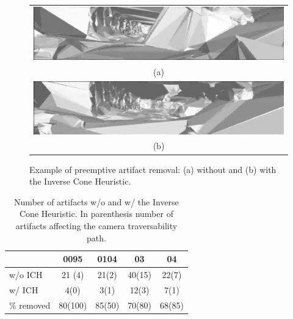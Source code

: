 \begin{figure}
\centering
\begin{tabular}{c}
\includegraphics[width=0.92\columnwidth]{./img//inverseConeWithout}\\
(a)\\
\includegraphics[width=0.92\columnwidth]{./img//inverseConeWith}\\
(b) 
\end{tabular}
\caption{Example of preemptive artifact removal: (a) without  and (b) with the Inverse Cone Heuristic.}
\label{fig:exampleArt}
\end{figure}



  

\begin{table}[t]
  \caption{Number of artifacts w/o and w/ the Inverse Cone Heuristic. In parenthesis number of artifacts affecting the camera traversability path.}
   \label{tab:numArtifacts}
   \centering
   \begin{tabular}{p{}cccc}
   \toprule 
                               & 0095  & 0104& 03 & 04   \\
   \hline
   w/o ICH                 & 21 (4) &21(2)& 40(15)& 22(7)\\
   w/  ICH                    & 4(0) &3(1)& 12(3)& 7(1)\\
 \% removed                 & 80(100) &85(50)& 70(80)& 68(85)\\
    \bottomrule
  \end{tabular}
  \end{table}
  



